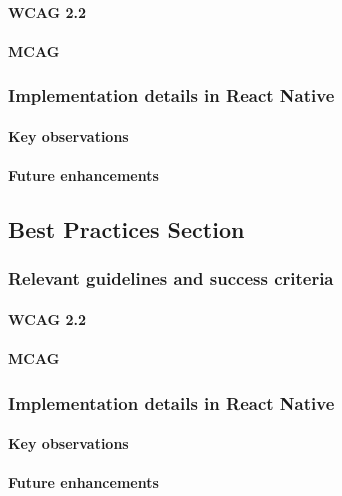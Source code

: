 \paragraph{WCAG 2.2}

\paragraph{MCAG}

\subsubsection{Implementation details in React Native}

\paragraph{Key observations}

\paragraph{Future enhancements}

\subsection{Best Practices Section}

\subsubsection{Relevant guidelines and success criteria}

\paragraph{WCAG 2.2}

\paragraph{MCAG}

\subsubsection{Implementation details in React Native}

\paragraph{Key observations}

\paragraph{Future enhancements}

